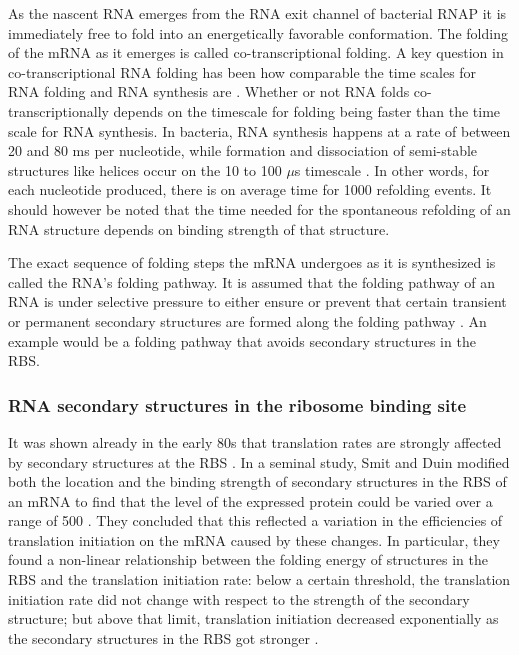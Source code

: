 As the nascent RNA emerges from the RNA exit channel of bacterial RNAP it is
immediately free to fold into an energetically favorable conformation. The
folding of the mRNA as it emerges is called co-transcriptional folding. A key
question in co-transcriptional RNA folding has been how comparable the time
scales for RNA folding and RNA synthesis are \cite{de_smit_translational_2003}.
Whether or not RNA folds co-transcriptionally depends on the timescale for
folding being faster than the time scale for RNA synthesis. In bacteria, RNA
synthesis happens at a rate of between 20 and 80 ms per nucleotide, while
formation and dissociation of semi-stable structures like helices occur on the
10 to 100 $\mu$s timescale \cite{isambert_jerky_2009}. In other words, for each
nucleotide produced, there is on average time for 1000 refolding events. It
should however be noted that the time needed for the spontaneous refolding of
an RNA structure depends on binding strength of that structure.

The exact sequence of folding steps the mRNA undergoes as it is synthesized is
called the RNA's folding pathway. It is assumed that the folding pathway of an
RNA is under selective pressure to either ensure or prevent that certain
transient or permanent secondary structures are formed along the folding
pathway \cite{pan_rna_2006}. An example would be a folding pathway that avoids
secondary structures in the RBS.

\subsubsection{RNA secondary structures in the ribosome binding site}
It was shown already in the early 80s that translation rates are strongly
affected by secondary structures at the RBS \cite{hall_role_1982}. In a seminal
study, Smit and Duin modified both the location and the binding strength of
secondary structures in the RBS of an mRNA to find that the level of the
expressed protein could be varied over a range of 500
\cite{de_smit_secondary_1990}. They concluded that this reflected a variation
in the efficiencies of translation initiation on the mRNA caused by these
changes. In particular, they found a non-linear relationship between the
folding energy of structures in the RBS and the translation initiation rate:
below a certain threshold, the translation initiation rate did not change with
respect to the strength of the secondary structure; but above that limit,
translation initiation decreased exponentially as the secondary structures in
the RBS got stronger \cite{de_smit_secondary_1990}.

